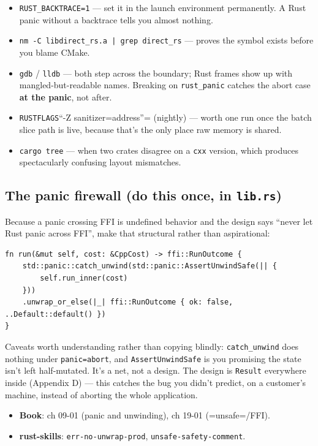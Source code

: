 \documentclass[11pt]{article}
\begin{document}
\begin{itemize}
\item \texttt{RUST\_BACKTRACE=1} — set it in the launch environment permanently. A Rust
panic without a backtrace tells you almost nothing.
\item \texttt{nm -C libdirect\_rs.a | grep direct\_rs} — proves the symbol exists before you
blame CMake.
\item \texttt{gdb} / \texttt{lldb} — both step across the boundary; Rust frames show up with
mangled-but-readable names. Breaking on \texttt{rust\_panic} catches the abort case
\textbf{at the panic}, not after.
\item \texttt{RUSTFLAGS}``-Z sanitizer=address''= (nightly) — worth one run once the batch
slice path is live, because that's the only place raw memory is shared.
\item \texttt{cargo tree} — when two crates disagree on a \texttt{cxx} version, which produces
spectacularly confusing layout mismatches.
\end{itemize}
\subsection{The panic firewall (do this once, in \texttt{lib.rs})}
\label{sec:orgbde4324}

Because a panic crossing FFI is undefined behavior and the design says ``never
let Rust panic across FFI'', make that structural rather than aspirational:

\begin{verbatim}
fn run(&mut self, cost: &CppCost) -> ffi::RunOutcome {
    std::panic::catch_unwind(std::panic::AssertUnwindSafe(|| {
        self.run_inner(cost)
    }))
    .unwrap_or_else(|_| ffi::RunOutcome { ok: false, ..Default::default() })
}
\end{verbatim}

Caveats worth understanding rather than copying blindly: \texttt{catch\_unwind} does
nothing under \texttt{panic=abort}, and \texttt{AssertUnwindSafe} is you promising the state
isn't left half-mutated. It's a net, not a design. The design is \texttt{Result}
everywhere inside (Appendix D) — this catches the bug you didn't predict, on a
customer's machine, instead of aborting the whole application.

\begin{itemize}
\item \textbf{\textbf{Book}}: ch 09-01 (panic and unwinding), ch 19-01 (=unsafe=/FFI).
\item \textbf{\textbf{rust-skills}}: \texttt{err-no-unwrap-prod}, \texttt{unsafe-safety-comment}.
\end{itemize}
\end{document}
